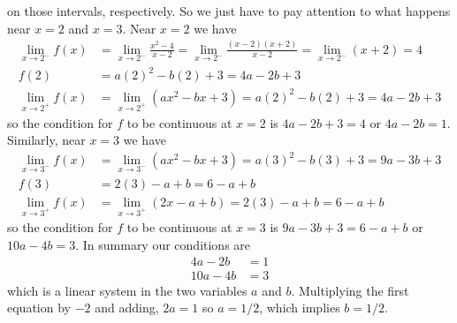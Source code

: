 \documentclass{article}
\begin{document}
\begin{enumerate}
  on those intervals, respectively.  So we just have to pay attention
  to what happens near $x=2$ and $x=3$.  Near $x=2$ we have
  \begin{align*}
    \lim_{x\to 2^-} f(x) &= \lim_{x\to 2^-} \frac{x^2-4}{x-2}
    = \lim_{x\to 2^-} \frac{(x-2)(x+2)}{x-2} = \lim_{x\to 2^-} (x+2) = 4 \\
    f(2) &= a(2)^2-b(2)+3 = 4a-2b+3 \\
    \lim_{x\to 2^+} f(x) &= \lim_{x\to 2^+} (ax^2-bx+3) = a(2)^2-b(2)+3
    = 4a-2b+3
  \end{align*}
  so the condition for $f$ to be continuous at $x=2$ is $4a-2b+3=4$ or
  $4a-2b=1$.  Similarly, near $x=3$ we have
  \begin{align*}
    \lim_{x\to 3^-} f(x) &= \lim_{x\to 3^-} (ax^2-bx+3) = a(3)^2-b(3)+3 = 
    9 a -3 b + 3 \\
    f(3) &= 2(3)-a+b = 6-a+b \\
    \lim_{x\to 3^+} f(x) &= \lim_{x\to 3^+} (2x-a+b) = 2(3)-a+b = 6-a+b
  \end{align*}
  so the condition for $f$ to be continuous at $x=3$ is
  $9a-3b+3=6-a+b$ or $10a-4b=3$.  In summary our conditions are
  \begin{align*}
    4a-2b&=1 \\
    10a-4b&=3
  \end{align*}
  which is a linear system in the two variables $a$ and $b$.
  Multiplying the first equation by $-2$ and adding, $2a=1$ so
  $a=1/2$, which implies $b=1/2$.
\end{enumerate}
\end{document}
